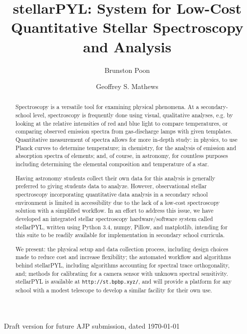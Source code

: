 \documentclass[prb,preprint]{revtex4-1}
\begin{document}
	\title{stellarPYL: System for Low-Cost Quantitative Stellar Spectroscopy and Analysis}
	\author{Brunston Poon}
	\author{Geoffrey S. Mathews}
	
	Draft version for future AJP submission, dated \today
	
\begin{abstract}
	Spectroscopy is a versatile tool for examining physical phenomena. At a secondary-school level, spectroscopy is frequently done using visual, qualitative analyses, e.g. by looking at the relative intensities of red and blue light to compare temperatures, or comparing observed emission spectra from gas-discharge lamps with given templates. Quantitative measurement of spectra allows for more in-depth study: in physics, to use Planck curves to determine temperature; in chemistry, for the analysis of emission and absorption spectra of elements; and, of course, in astronomy, for countless purposes including determining the elemental composition and temperature of a star.
	
	Having astronomy students collect their own data for this analysis is generally preferred to giving students data to analyze. However, observational stellar spectroscopy incorporating quantitative data analysis in a secondary school environment is limited in accessibility due to the lack of a low-cost spectroscopy solution with a simplified workflow. In an effort to address this issue, we have developed an integrated stellar spectroscopy hardware/software system called stellarPYL, written using Python 3.4, numpy, Pillow, and matplotlib, intending for this suite to be readily available for implementation in secondary school curricula.
	
	We present: the physical setup and data collection process, including design choices made to reduce cost and increase flexibility; the automated workflow and algorithms behind stellarPYL, including algorithms accounting for spectral trace orthogonality, and; methods for calibrating for a camera sensor with unknown spectral sensitivity. stellarPYL is available at \verb|http://st.bpbp.xyz/|, and will provide a platform for any school with a modest telescope to develop a similar facility for their own use.
\end{abstract}
\maketitle
\end{document}
